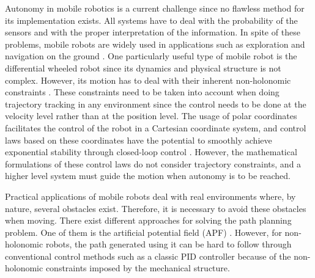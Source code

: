 \documentclass[conference]{IEEEtran}
\begin{document}
Autonomy in mobile robotics is a current challenge since no flawless method for
its implementation exists. All systems have to deal with the probability of the
sensors and with the proper interpretation of the information. In spite of
these problems, mobile robots are widely used in applications such as
exploration and navigation on the ground \cite{Bonin-Font2008}.  One
particularly useful type of mobile robot is the differential wheeled robot
since its dynamics and physical structure is not complex. However, its motion
has to deal with their inherent non-holonomic constraints \cite{Rubayat}.
These constraints need to be taken into account when doing trajectory tracking
in any environment since the control needs to be done at the velocity level
rather than at the position level.
The usage of polar coordinates facilitates the control of the robot in a
Cartesian coordinate system, and control laws based on these coordinates have
the potential to smoothly achieve exponential stability through closed-loop
control \cite{Matoui}. However, the mathematical formulations of these control
laws do not consider trajectory constraints, and a higher level system must
guide the motion when autonomy is to be reached.

Practical applications of mobile robots deal with real environments where, by
nature, several obstacles exist. Therefore, it is necessary to avoid these
obstacles when moving. There exist different approaches for solving the path
planning problem. One of them is the artificial potential field (APF)
\cite{Woods}. However, for non-holonomic robots, the path generated using it
can be hard to follow through conventional control methods such as a classic
PID controller because of the non-holonomic constraints imposed by the
mechanical structure.
\end{document}
